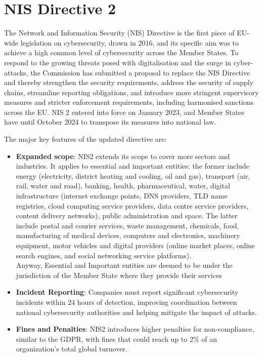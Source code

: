 \section{NIS Directive 2}
\label{sec:nis-directive-2}

The Network and Information Security (NIS) Directive is the first piece of EU-wide legislation on cybersecurity, drawn in 2016, and its specific aim was to achieve a high common level of cybersecurity across the Member States. To respond to the growing threats posed with digitalisation and the surge in cyber-attacks, the Commission has submitted a proposal to replace the NIS Directive and thereby strengthen the security requirements, address the security of supply chains, streamline reporting obligations, and introduce more stringent supervisory measures and stricter enforcement requirements, including harmonised sanctions across the EU. NIS 2 entered into force on January 2023, and Member States have until October 2024 to transpose its measures into national law.

The major key features of the updated directive are:~\cite{nis2-directive-faqs}
\begin{itemize}
  \item \textbf{Expanded scope}: NIS2 extends its scope to cover more sectors and industries. It applies to essential and important entities: the former include energy (electricity, district heating and cooling, oil and gas), transport (air, rail, water and road), banking, health, pharmaceutical, water, digital infrastructure (internet exchange points, DNS providers, TLD name registries, cloud computing service providers, data centre service providers, content delivery networks), public administration and space. The latter include postal and courier services, waste management, chemicals, food, manufacturing of medical devices, computers and electronics, machinery equipment, motor vehicles and digital providers (online market places, online search engines, and social networking service platforms).\\
  Anyway, Essential and Important entities are deemed to be under the jurisdiction of the Member State where they provide their services
  \item \textbf{Incident Reporting}: Companies must report significant cybersecurity incidents within 24 hours of detection, improving coordination between national cybersecurity authorities and helping mitigate the impact of attacks.
  \item \textbf{Fines and Penalties}: NIS2 introduces higher penalties for non-compliance, similar to the GDPR, with fines that could reach up to 2\% of an organization's total global turnover.
\end{itemize}

